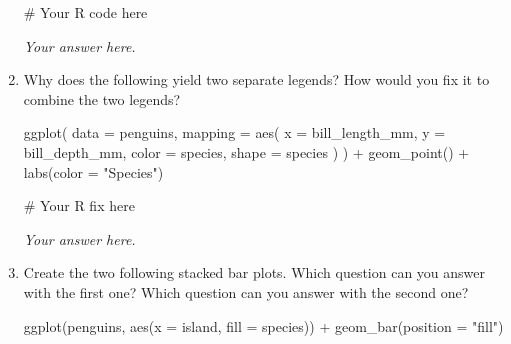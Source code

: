 \documentclass[
  letterpaper,
  DIV=11,
  numbers=noendperiod]{scrreprt}
\newenvironment{Shaded}{\begin{snugshade}}{\end{snugshade}}
\newcommand{\AttributeTok}[1]{\textcolor[rgb]{0.40,0.45,0.13}{#1}}
\newcommand{\CommentTok}[1]{\textcolor[rgb]{0.37,0.37,0.37}{#1}}
\newcommand{\FunctionTok}[1]{\textcolor[rgb]{0.28,0.35,0.67}{#1}}
\newcommand{\NormalTok}[1]{\textcolor[rgb]{0.00,0.23,0.31}{#1}}
\newcommand{\SpecialCharTok}[1]{\textcolor[rgb]{0.37,0.37,0.37}{#1}}
\newcommand{\StringTok}[1]{\textcolor[rgb]{0.13,0.47,0.30}{#1}}
\begin{document}
\begin{enumerate}
\begin{tcolorbox}
\begin{Shaded}
\begin{Highlighting}[]
\CommentTok{\# Your R code here}
\end{Highlighting}
\end{Shaded}

  \emph{Your answer here.}

  \end{tcolorbox}
\item
  Why does the following yield two separate legends? How would you fix
  it to combine the two legends?

\begin{Shaded}
\begin{Highlighting}[]
\FunctionTok{ggplot}\NormalTok{(}
  \AttributeTok{data =}\NormalTok{ penguins,}
  \AttributeTok{mapping =} \FunctionTok{aes}\NormalTok{(}
    \AttributeTok{x =}\NormalTok{ bill\_length\_mm, }\AttributeTok{y =}\NormalTok{ bill\_depth\_mm, }
    \AttributeTok{color =}\NormalTok{ species, }\AttributeTok{shape =}\NormalTok{ species}
\NormalTok{  )}
\NormalTok{) }\SpecialCharTok{+}
  \FunctionTok{geom\_point}\NormalTok{() }\SpecialCharTok{+}
  \FunctionTok{labs}\NormalTok{(}\AttributeTok{color =} \StringTok{"Species"}\NormalTok{)}
\end{Highlighting}
\end{Shaded}

  \begin{tcolorbox}[enhanced jigsaw, left=2mm, rightrule=.15mm, bottomtitle=1mm, opacitybacktitle=0.6, leftrule=.75mm, opacityback=0, colframe=quarto-callout-note-color-frame, bottomrule=.15mm, coltitle=black, toptitle=1mm, colback=white, titlerule=0mm, colbacktitle=quarto-callout-note-color!10!white, title={Answer}, toprule=.15mm, breakable, arc=.35mm]

\begin{Shaded}
\begin{Highlighting}[]
\CommentTok{\# Your R fix here}
\end{Highlighting}
\end{Shaded}

  \emph{Your answer here.}

  \end{tcolorbox}
\item
  Create the two following stacked bar plots. Which question can you
  answer with the first one? Which question can you answer with the
  second one?

\begin{Shaded}
\begin{Highlighting}[]
\FunctionTok{ggplot}\NormalTok{(penguins, }\FunctionTok{aes}\NormalTok{(}\AttributeTok{x =}\NormalTok{ island, }\AttributeTok{fill =}\NormalTok{ species)) }\SpecialCharTok{+}
  \FunctionTok{geom\_bar}\NormalTok{(}\AttributeTok{position =} \StringTok{"fill"}\NormalTok{)}
\end{Highlighting}
\end{Shaded}


\end{enumerate}
\end{document}

